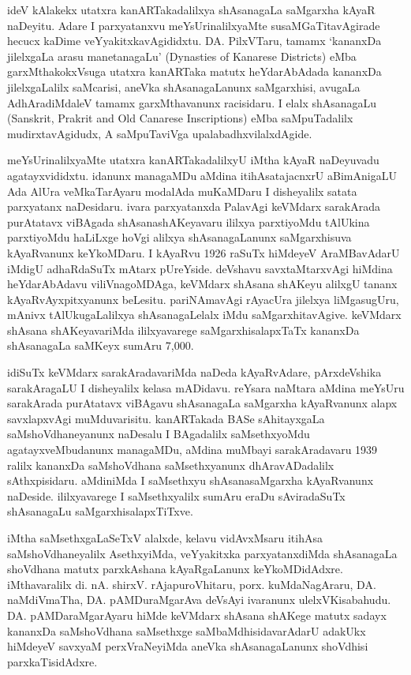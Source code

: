 \documentclass[11pt,a4size]{article}
\begin{document}
ideV kAlakekx utatxra kanARTakadalilxya shAsanagaLa saMgarxha kAyaR
naDeyitu. Adare I parxyatanxvu meYsUrinalilxyaMte susaMGaTitavAgirade
hecucx kaDime veYyakitxkavAgididxtu. DA. PilxVTaru, tamamx `kananxDa
jilelxgaLa arasu manetanagaLu' {\rm (Dynasties of
    Kanarese Districts)} eMba garxMthakokxVsuga utatxra kanARTaka
matutx heYdarAbAdada kananxDa jilelxgaLalilx saMcarisi, aneVka
shAsanagaLanunx saMgarxhisi, avugaLa AdhAradiMdaleV tamamx
garxMthavanunx racisidaru. I elalx shAsanagaLu {\rm
    (Sanskrit, Prakrit and Old Canarese Inscriptions)} eMba
saMpuTadalilx mudirxtavAgidudx, A saMpuTaviVga upalabadhxvilalxdAgide.

meYsUrinalilxyaMte utatxra kanARTakadalilxyU iMtha kAyaR naDeyuvadu
agatayxvididxtu. idanunx managaMDu aMdina itihAsatajacnxrU aBimAnigaLU
Ada AlUra veMkaTarAyaru modalAda muKaMDaru I disheyalilx satata
parxyatanx naDesidaru. ivara parxyatanxda PalavAgi keVMdarx sarakArada
purAtatavx viBAgada shAsanashAKeyavaru ililxya parxtiyoMdu tAlUkina
parxtiyoMdu haLiLxge hoVgi alilxya shAsanagaLanunx saMgarxhisuva
kAyaRvanunx keYkoMDaru. I kAyaRvu 1926 raSuTx hiMdeyeV AraMBavAdarU
iMdigU adhaRdaSuTx mAtarx pUreYside. deVshavu savxtaMtarxvAgi hiMdina
heYdarAbAdavu viliVnagoMDAga, keVMdarx shAsana shAKeyu alilxgU tananx
kAyaRvAyxpitxyanunx beLesitu. pariNAmavAgi rAyacUra jilelxya
liMgasugUru, mAnivx tAlUkugaLalilxya shAsanagaLelalx iMdu
saMgarxhitavAgive. keVMdarx shAsana shAKeyavariMda ililxyavarege
saMgarxhisalapxTaTx kananxDa shAsanagaLa saMKeyx sumAru 7,000.

idiSuTx keVMdarx sarakAradavariMda naDeda kAyaRvAdare, pArxdeVshika
sarakAragaLU I disheyalilx kelasa mADidavu. reYsara naMtara aMdina
meYsUru sarakArada purAtatavx viBAgavu shAsanagaLa saMgarxha
kAyaRvanunx alapx savxlapxvAgi muMduvarisitu. kanARTakada BASe
sAhitayxgaLa saMshoVdhaneyanunx naDesalu I BAgadalilx saMsethxyoMdu
agatayxveMbudanunx managaMDu, aMdina muMbayi sarakAradavaru 1939
ralilx kananxDa saMshoVdhana saMsethxyanunx dhAravADadalilx
sAthxpisidaru. aMdiniMda I saMsethxyu shAsanasaMgarxha kAyaRvanunx
naDeside. ililxyavarege I saMsethxyalilx sumAru eraDu sAviradaSuTx
shAsanagaLu saMgarxhisalapxTiTxve.

iMtha saMsethxgaLaSeTxV alalxde, kelavu vidAvxMsaru itihAsa
saMshoVdhaneyalilx AsethxyiMda, veYyakitxka parxyatanxdiMda
shAsanagaLa shoVdhana matutx parxkAshana kAyaRgaLanunx
keYkoMDidAdxre. iMthavaralilx di. nA. shirxV. rAjapuroVhitaru,
porx. kuMdaNagAraru, DA. naMdiVmaTha, DA. pAMDuraMgarAva deVsAyi
ivaranunx ulelxVKisabahudu. DA. pAMDaraMgarAyaru hiMde keVMdarx
shAsana shAKege matutx sadayx kananxDa saMshoVdhana saMsethxge
saMbaMdhisidavarAdarU adakUkx hiMdeyeV savxyaM perxVraNeyiMda aneVka
shAsanagaLanunx shoVdhisi parxkaTisidAdxre.
\end{document}
